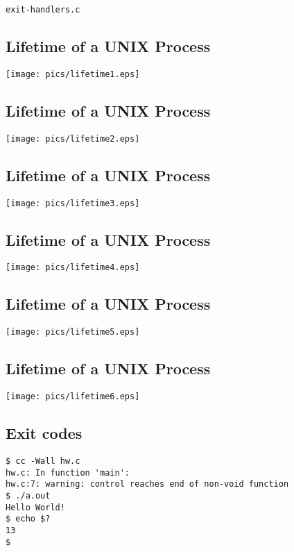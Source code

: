 \documentclass[xga]{xdvislides}
\begin{document}
{\tt exit-handlers.c}

\subsection{Lifetime of a UNIX Process}
\begin{center}
	\texttt{[image: pics/lifetime1.eps]}
\end{center}

\subsection{Lifetime of a UNIX Process}
\begin{center}
	\texttt{[image: pics/lifetime2.eps]}
\end{center}

\subsection{Lifetime of a UNIX Process}
\begin{center}
	\texttt{[image: pics/lifetime3.eps]}
\end{center}

\subsection{Lifetime of a UNIX Process}
\begin{center}
	\texttt{[image: pics/lifetime4.eps]}
\end{center}

\subsection{Lifetime of a UNIX Process}
\begin{center}
	\texttt{[image: pics/lifetime5.eps]}
\end{center}

\subsection{Lifetime of a UNIX Process}
\begin{center}
	\texttt{[image: pics/lifetime6.eps]}
\end{center}

\subsection{Exit codes}
\begin{verbatim}
$ cc -Wall hw.c
hw.c: In function 'main':
hw.c:7: warning: control reaches end of non-void function
$ ./a.out
Hello World!
$ echo $?
13
$
\end{verbatim}
\end{document}
